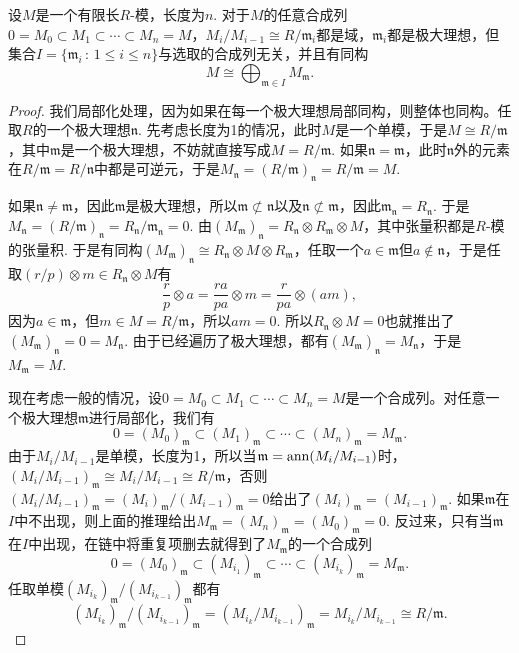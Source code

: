 \begin{thm}
设$M$是一个有限长$R$-模，长度为$n$. 对于$M$的任意合成列$0=M_0\subset M_1\subset \cdots\subset M_n=M$，$M_i/M_{i-1}\cong R/\mathfrak{m}_i$都是域，$\mathfrak{m}_i$都是极大理想，但集合$I=\{\mathfrak{m}_i\,:\,1\leq i\leq n\}$与选取的合成列无关，并且有同构
\[
	M\cong \bigoplus_{\mathfrak{m}\in I} M_\mathfrak{m}.
\]
\end{thm}

\begin{proof}
	我们局部化处理，因为如果在每一个极大理想局部同构，则整体也同构。任取$R$的一个极大理想$\mathfrak{n}$. 先考虑长度为1的情况，此时$M$是一个单模，于是$M\cong R/\mathfrak{m}$，其中$\mathfrak{m}$是一个极大理想，不妨就直接写成$M=R/\mathfrak{m}$. 如果$\mathfrak{n}=\mathfrak{m}$，此时$\mathfrak{n}$外的元素在$R/\mathfrak{m}=R/\mathfrak{n}$中都是可逆元，于是$M_{\mathfrak{n}}=(R/\mathfrak{m})_{\mathfrak{n}}=R/\mathfrak{m}=M$. 

	如果$\mathfrak{n}\neq \mathfrak{m}$，因此$\mathfrak{m}$是极大理想，所以$\mathfrak{m}\not\subset \mathfrak{n}$以及$\mathfrak{n}\not\subset \mathfrak{m}$，因此$\mathfrak{m}_\mathfrak{n}=R_\mathfrak{n}$. 于是$M_\mathfrak{n}=(R/\mathfrak{m})_\mathfrak{n}=R_\mathfrak{n}/\mathfrak{m}_\mathfrak{n}=0$. 由$(M_\mathfrak{m})_\mathfrak{n}=R_\mathfrak{n}\otimes R_\mathfrak{m} \otimes M$，其中张量积都是$R$-模的张量积. 于是有同构$(M_\mathfrak{m})_\mathfrak{n}\cong R_\mathfrak{n}\otimes M\otimes R_\mathfrak{m}$，任取一个$a\in \mathfrak{m}$但$a\not\in \mathfrak{n}$，于是任取$(r/p)\otimes m \in R_\mathfrak{n}\otimes M$有
	\[
		\frac{r}{p}\otimes a=\frac{ra}{pa}\otimes m =\frac{r}{pa}\otimes (am),
	\]
	因为$a\in \mathfrak{m}$，但$m\in M=R/\mathfrak{m}$，所以$am=0$. 所以$R_\mathfrak{n}\otimes M=0$也就推出了$(M_\mathfrak{m})_\mathfrak{n}=0=M_\mathfrak{n}$. 由于已经遍历了极大理想，都有$(M_\mathfrak{m})_\mathfrak{n}=M_\mathfrak{n}$，于是$M_\mathfrak{m}=M$.

	现在考虑一般的情况，设$0=M_0\subset M_1\subset \cdots\subset M_n=M$是一个合成列。对任意一个极大理想$\mathfrak{m}$进行局部化，我们有
	\[
	0=(M_0)_\mathfrak{m}\subset (M_1)_\mathfrak{m}\subset \cdots\subset (M_n)_\mathfrak{m}=M_\mathfrak{m}.
	\]
	由于$M_i/M_{i-1}$是单模，长度为1，所以当$\mathfrak{m}=\operatorname{ann}(M_i/M_{i-1})$时，$(M_i/M_{i-1})_\mathfrak{m}\cong M_i/M_{i-1}\cong R/\mathfrak{m}$，否则$(M_i/M_{i-1})_{\mathfrak{m}}=(M_i)_{\mathfrak{m}}/(M_{i-1})_{\mathfrak{m}}=0$给出了$(M_i)_{\mathfrak{m}}=(M_{i-1})_{\mathfrak{m}}$. 如果$\mathfrak{m}$在$I$中不出现，则上面的推理给出$M_\mathfrak{m}=(M_n)_\mathfrak{m}=(M_0)_\mathfrak{m}=0$. 反过来，只有当$\mathfrak{m}$在$I$中出现，在链中将重复项删去就得到了$M_\mathfrak{m}$的一个合成列
	\[
	0=(M_0)_\mathfrak{m}\subset (M_{i_1})_\mathfrak{m}\subset \cdots\subset (M_{i_k})_\mathfrak{m}=M_\mathfrak{m}.
	\]
	任取单模$(M_{i_k})_\mathfrak{m}/(M_{i_{k-1}})_\mathfrak{m}$都有
	\[
	(M_{i_k})_\mathfrak{m}/(M_{i_{k-1}})_\mathfrak{m}=(M_{i_k}/M_{i_{k-1}})_\mathfrak{m}=M_{i_k}/M_{i_{k-1}}\cong R/\mathfrak{m}.
	\]


\end{proof}
